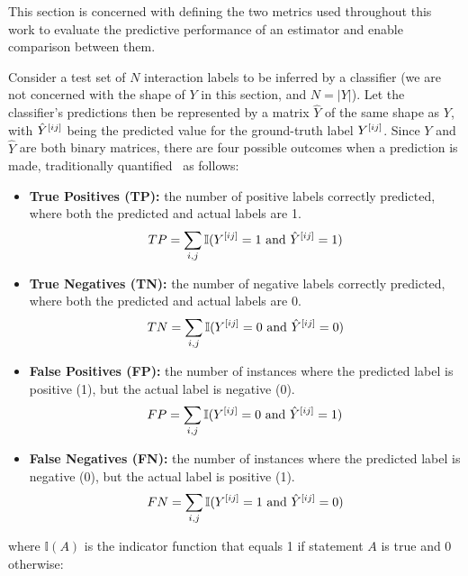 
This section is concerned with defining the two metrics used throughout this work to evaluate the predictive performance of an estimator and enable comparison between them. %

Consider a test set of $N$ interaction labels to be inferred by a classifier (we are not concerned with the shape of $Y$ in this section, and $N=|Y|$). Let the classifier's predictions then be represented by a matrix $\hat Y$ of the same shape as $Y$, with $\hat Y^{[ij]}$ being the predicted value for the ground-truth label $Y^{[ij]}$. Since $Y$ and $\hat Y$ are both binary matrices, there are four possible outcomes when a prediction is made, traditionally quantified~\cite{} as follows:
%
\begin{itemize}
    \item \textbf{True Positives (TP):} the number of positive labels correctly predicted, where both the predicted and actual labels are 1.
    \begin{equation}
        TP = \sum_{i,j} \mathbb{I}(Y^{[ij]} = 1 \text{ and } \hat{Y}^{[ij]} = 1)
    \end{equation}

    \item \textbf{True Negatives (TN):} the number of negative labels correctly predicted, where both the predicted and actual labels are 0.
    \begin{equation}
        TN = \sum_{i,j} \mathbb{I}(Y^{[ij]} = 0 \text{ and } \hat{Y}^{[ij]} = 0)
    \end{equation}

    \item \textbf{False Positives (FP):} the number of instances where the predicted label is positive (1), but the actual label is negative (0).
    \begin{equation}
        FP = \sum_{i,j} \mathbb{I}(Y^{[ij]} = 0 \text{ and } \hat{Y}^{[ij]} = 1)
    \end{equation}

    \item \textbf{False Negatives (FN):} the number of instances where the predicted label is negative (0), but the actual label is positive (1).
    \begin{equation}
        FN = \sum_{i,j} \mathbb{I}(Y^{[ij]} = 1 \text{ and } \hat{Y}^{[ij]} = 0)
    \end{equation}
\end{itemize}
%
where \(\mathbb{I}(A)\) is the indicator function that equals 1 if statement \(A\) is true and 0 otherwise:

